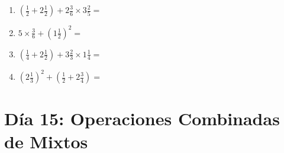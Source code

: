 \documentclass[12pt]{article}
\begin{document}
\begin{enumerate}
\item \large $ (\frac{1}{2} + 2 \frac{1}{2}) + 2 \frac{3}{6} \times 3 \frac{2}{5} = $ \vspace{1.8cm}
\item \large $ 5 \times \frac{3}{6} + (1 \frac{1}{2})^2 = $ \vspace{1.8cm}
\item \large $ (\frac{1}{4} + 2 \frac{1}{2}) + 3 \frac{2}{3} \times 1 \frac{1}{4} = $ \vspace{1.8cm}
\item \large $ (2 \frac{1}{3})^2 + (\frac{1}{2} + 2 \frac{3}{4}) = $ \vspace{1.8cm}
\end{enumerate}\newpage
\section*{Día 15: Operaciones Combinadas de Mixtos}
\end{document}
